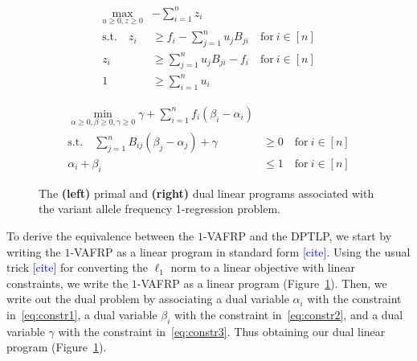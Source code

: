 \documentclass[10pt]{article}
\newcommand{\henri}[1]{\textcolor{blue}{[#1]}}
\begin{document}
\begin{figure}
    \begin{tcolorbox}[colback=white,colframe=black]
        \begin{minipage}[t]{0.40\textwidth}
            \vspace{-1em}
            \begin{align}
                \max_{u \geq 0, z \geq 0} &-\sum_{i=1}^n z_i \nonumber \\
                \text{s.t.}\quad z_i &\geq f_i - \sum_{j=1}^n u_j B_{ji} \quad\text{for}\  i \in [n] \label{eq:constr1} \\
                z_i &\geq \sum_{j=1}^n u_j B_{ji} - f_i \quad\text{for}\  i \in [n] \label{eq:constr2} \\
                1 &\geq \sum_{i=1}^n u_i \label{eq:constr3}
            \end{align}
        \end{minipage}
        \hfill\vline\hfill
        \hspace{-2em}
        \begin{minipage}[t]{0.50\textwidth}
            \vspace{-1em}
            \begin{align}
                \min_{\alpha \geq 0, \beta \geq 0, \gamma \geq 0} \gamma + \sum_{i=1}^n f_i(\beta_i - \alpha_i) \nonumber \\
                \text{s.t.} \quad 
                \sum_{j=1}^n B_{ij}(\beta_j - \alpha_j) + \gamma &\geq 0 \quad\text{for}\  i \in [n] \label{eq:dualconstr0} \\
                \alpha_i + \beta_i &\leq 1 \quad\text{for}\  i \in [n] \label{eq:dualconstr1}
            \end{align}
        \end{minipage}
    \end{tcolorbox}
    \caption{\label{fig:primal_dual} The \textbf{(left)} primal and \textbf{(right)} dual linear 
    programs associated with the variant allele frequency 1-regression problem.}
\end{figure}

To derive the equivalence between the $1$-VAFRP and the DPTLP, we start by writing the 
$1$-VAFRP as a linear program in standard form \henri{cite}.
Using the usual trick \henri{cite} for converting the $\ell_1$ 
norm to a linear objective with linear constraints, we write the $1$-VAFRP as a 
linear program (Figure~\ref{fig:primal_dual}). Then, we write out the dual problem by associating
a dual variable $\alpha_i$ with the constraint in~\eqref{eq:constr1},
a dual variable $\beta_i$ with the constraint in~\eqref{eq:constr2},
and a dual variable $\gamma$ with the constraint in~\eqref{eq:constr3}.
Thus obtaining our dual linear program (Figure~\ref{fig:primal_dual}).
\end{document}
